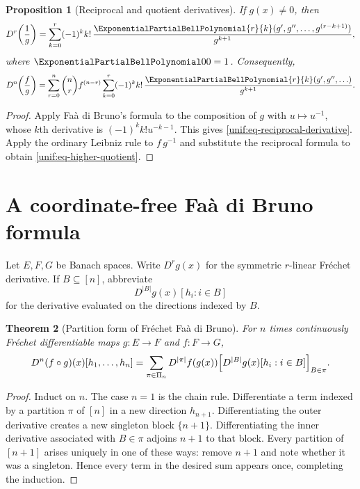 \documentclass[11pt,a4paper,oneside,openany]{book}
\newtheorem{theorem}{Theorem}[chapter]
\newtheorem{proposition}[theorem]{Proposition}
\theoremstyle{definition}
\theoremstyle{remark}
\begin{document}
\begin{proposition}[Reciprocal and quotient derivatives]
\label{unif:prop-reciprocal-derivative}
If $g(x)\ne0$, then
\begin{equation}\label{unif:eq-reciprocal-derivative}
 D^r\!\left(\frac1g\right)
 =\sum_{k=0}^{r}(-1)^k k!\,
 \frac{\ExponentialPartialBellPolynomial{r}{k}(g',g'',\ldots,g^{(r-k+1)})}{g^{k+1}},
\end{equation}
where $\ExponentialPartialBellPolynomial00=1$. Consequently,
\begin{equation}\label{unif:eq-higher-quotient}
 D^n\!\left(\frac fg\right)
 =\sum_{r=0}^{n}\binom nr f^{(n-r)}
 \sum_{k=0}^{r}(-1)^k k!\,
 \frac{\ExponentialPartialBellPolynomial{r}{k}(g',g'',\ldots)}{g^{k+1}}.
\end{equation}
\end{proposition}
\begin{proof}
Apply Fa\`a di Bruno's formula to the composition of $g$ with
$u\mapsto u^{-1}$, whose $k$th derivative is
$(-1)^k k!u^{-k-1}$. This gives
\eqref{unif:eq-reciprocal-derivative}. Apply the ordinary Leibniz rule to
$f\,g^{-1}$ and substitute the reciprocal formula to obtain
\eqref{unif:eq-higher-quotient}.
\end{proof}

\section{A coordinate-free Fa\`a di Bruno formula}

Let $E,F,G$ be Banach spaces. Write $D^rg(x)$ for the symmetric $r$-linear
Fr\'echet derivative. If $B\subseteq[n]$, abbreviate
\[
 D^{|B|}g(x)[h_i:i\in B]
\]
for the derivative evaluated on the directions indexed by $B$.

\begin{theorem}[Partition form of Fr\'echet Fa\`a di Bruno]
\label{unif:thm-frechet-faa}
For $n$ times continuously Fr\'echet differentiable maps $g:E\to F$ and
$f:F\to G$,
\begin{equation}\label{unif:eq-frechet-faa}
 D^n(f\circ g)(x)[h_1,\ldots,h_n]
 =\sum_{\pi\in\Pi_n}D^{|\pi|}f(g(x))
 \Bigl[D^{|B|}g(x)[h_i:i\in B]\Bigr]_{B\in\pi}.
\end{equation}
\end{theorem}
\begin{proof}
Induct on $n$. The case $n=1$ is the chain rule. Differentiate a term indexed
by a partition $\pi$ of $[n]$ in a new direction $h_{n+1}$. Differentiating
the outer derivative creates a new singleton block $\{n+1\}$. Differentiating
the inner derivative associated with $B\in\pi$ adjoins $n+1$ to that block.
Every partition of $[n+1]$ arises uniquely in one of these ways: remove
$n+1$ and note whether it was a singleton. Hence every term in the desired
sum appears once, completing the induction.
\end{proof}
\end{document}
